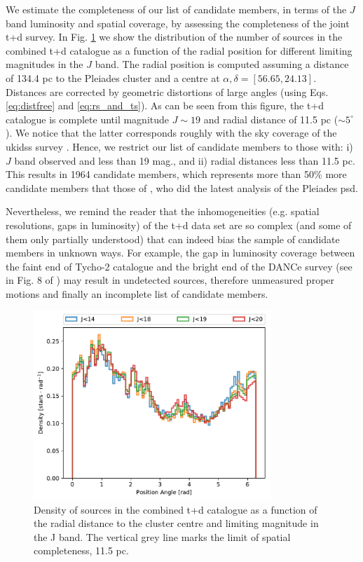 We estimate the completeness of our list of candidate members, in terms of the $J$ band luminosity and
spatial coverage, by assessing the completeness of the joint \gls{t+d} survey. In Fig. \ref{fig:completenessT+D} we show the distribution of the number of sources in the combined \gls{t+d} catalogue as a function of the radial position for different limiting magnitudes in the $J$ band.
The radial position is computed assuming a distance of 134.4 pc to the Pleiades cluster \citep{Galli2017} and a centre at $\alpha,\delta =[56.65,24.13]$. Distances are corrected by geometric distortions of large angles (using Eqs. \ref{eq:distfree} and \ref{eq:rs_and_ts}).
As can be seen from this figure, the \gls{t+d} catalogue is complete until magnitude $J\sim19$ and radial distance of 11.5 pc ($\sim5^\circ$). We notice that the latter corresponds roughly with the sky coverage of the \gls{ukidss} survey \citep{2007MNRAS.379.1599L}.
Hence, we restrict our list of candidate members to those with: i) $J$ band observed and less than 19 mag., and ii) radial distances less than 11.5 pc. This results in 1964 candidate members, which represents more than 50\% more candidate members that those of  \citet{Converse2010}, who did the latest analysis of the Pleiades \gls{psd}.

Nevertheless, we remind the reader that the inhomogeneities (e.g. spatial resolutions, gaps in luminosity) of the \gls{t+d} data set are so complex (and some of them only partially understood) that can indeed bias the sample of candidate members in unknown ways. For example, the gap in luminosity coverage between the faint end of Tycho-2 catalogue and the bright end of the DANCe survey (see in Fig. 8 of \citealt{Bouy2015}) may result in undetected sources, therefore unmeasured proper motions and finally an incomplete list of candidate members.

\begin{figure}[ht!]
\begin{center}
\includegraphics[page=2,width=0.8\textwidth]{./background/Figures/RadiiDistribution_Tycho+DANCe_Jmag.pdf}
\caption{Density of sources in the combined \gls{t+d} catalogue as a function of the radial distance to the cluster centre and limiting magnitude in the J band. The vertical grey line marks the limit of spatial completeness, 11.5 pc.}
\label{fig:completenessT+D}
\end{center}
\end{figure}




